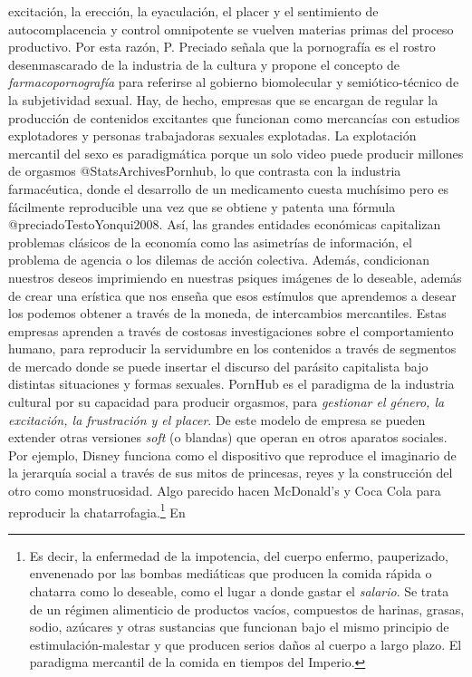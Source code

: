 \documentclass[
]{article}
\begin{document}
excitación, la erección, la eyaculación, el placer y el sentimiento de
autocomplacencia y control omnipotente se vuelven materias primas del
proceso productivo. Por esta razón, P. Preciado señala que la
pornografía es el rostro desenmascarado de la industria de la cultura y
propone el concepto de \emph{farmacopornografía} para referirse al
gobierno biomolecular y semiótico-técnico de la subjetividad sexual.
Hay, de hecho, empresas que se encargan de regular la producción de
contenidos excitantes que funcionan como mercancías con estudios
explotadores y personas trabajadoras sexuales explotadas. La explotación
mercantil del sexo es paradigmática porque un solo video puede producir
millones de orgasmos @StatsArchivesPornhub, lo que contrasta con la
industria farmacéutica, donde el desarrollo de un medicamento cuesta
muchísimo pero es fácilmente reproducible una vez que se obtiene y
patenta una fórmula @preciadoTestoYonqui2008. Así, las grandes entidades
económicas capitalizan problemas clásicos de la economía como las
asimetrías de información, el problema de agencia o los dilemas de
acción colectiva. Además, condicionan nuestros deseos imprimiendo en
nuestras psiques imágenes de lo deseable, además de crear una erística
que nos enseña que esos estímulos que aprendemos a desear los podemos
obtener a través de la moneda, de intercambios mercantiles. Estas
empresas aprenden a través de costosas investigaciones sobre el
comportamiento humano, para reproducir la servidumbre en los contenidos
a través de segmentos de mercado donde se puede insertar el discurso del
parásito capitalista bajo distintas situaciones y formas sexuales.
PornHub es el paradigma de la industria cultural por su capacidad para
producir orgasmos, para \emph{gestionar el género, la excitación, la
frustración y el placer}. De este modelo de empresa se pueden extender
otras versiones \emph{soft} (o blandas) que operan en otros aparatos
sociales. Por ejemplo, Disney funciona como el dispositivo que reproduce
el imaginario de la jerarquía social a través de sus mitos de princesas,
reyes y la construcción del otro como monstruosidad. Algo parecido hacen
McDonald's y Coca Cola para reproducir la chatarrofagia.\footnote{Es
  decir, la enfermedad de la impotencia, del cuerpo enfermo,
  pauperizado, envenenado por las bombas mediáticas que producen la
  comida rápida o chatarra como lo deseable, como el lugar a donde
  gastar el \emph{salario}. Se trata de un régimen alimenticio de
  productos vacíos, compuestos de harinas, grasas, sodio, azúcares y
  otras sustancias que funcionan bajo el mismo principio de
  estimulación-malestar y que producen serios daños al cuerpo a largo
  plazo. El paradigma mercantil de la comida en tiempos del Imperio.} En
\end{document}
